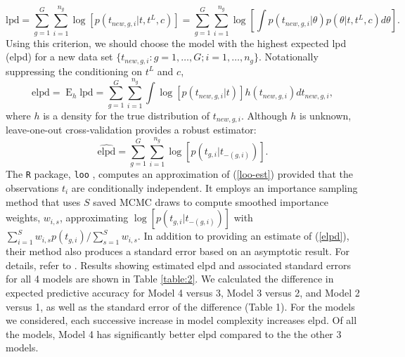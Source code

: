 \documentclass[aoas]{imsart}
\newcommand{\op}{\operatorname}
\begin{document}
\begin{equation}
\mbox{lpd} = \sum_{g=1}^G \sum_{i=1}^{n_g} \log[p(t_{new,g,i}|t, t^L, c)] = \sum_{g=1}^G \sum_{i=1}^{n_g} \log \left[ \int p(t_{new,g, i}|\theta) p(\theta|t,t^L,c) d\theta \right].
\end{equation}
\noindent Using this criterion, we should choose the model with the highest expected lpd (elpd) for a new data set $\{t_{new,g,i}:g=1,\ldots,G; i=1,\ldots,n_g\}$. Notationally suppressing the conditioning on $t^L$ and $c$,
\begin{equation}
\mbox{elpd} = \op{E}_h \mbox{lpd} = \sum_{g=1}^G \sum_{i=1}^{n_g} \int \log [p(t_{new, g, i}|t)] h(t_{new,g,i}) d t_{new,g,i},
\label{elpd}
\end{equation}
where $h$ is a density for the true distribution of $t_{new,g,i}$. Although $h$ is unknown, leave-one-out cross-validation provides a robust estimator:
\begin{equation}
\widehat{\text{elpd}} = \sum_{g=1}^G \sum_{i=1}^{n_g} \log [p(t_{g,i}|t_{-(g,i)})].
\label{loo-est}
\end{equation}
The \texttt{R} package, \texttt{loo} \citep{loo}, computes an approximation of (\ref{loo-est}) provided that the observations $t_i$ are conditionally independent. It employs an importance sampling method that uses $S$ saved MCMC draws to compute smoothed importance weights, $w_{i,s}$, approximating $\log [p(t_{g,i}|t_{-(g,i)})]$ with $\sum_{i=1}^S w_{i,s} p(t_{g,i})/\sum_{s=1}^S w_{i,s}$. In addition to providing an estimate of (\ref{elpd}), their method also produces a standard error based on an asymptotic result. For details, refer to \cite{vehtari}.
Results showing estimated elpd and associated standard errors for all 4 models are shown in Table \ref{table:2}.
 We calculated the difference in expected predictive accuracy for Model 4 versus 3, Model 3 versus 2, and Model 2 versus 1, as well as the standard error of the difference (Table 1). For the models we considered, each successive increase in model complexity increases elpd.  Of all the models, Model 4 has significantly better elpd compared to the the other 3 models.
\end{document}
